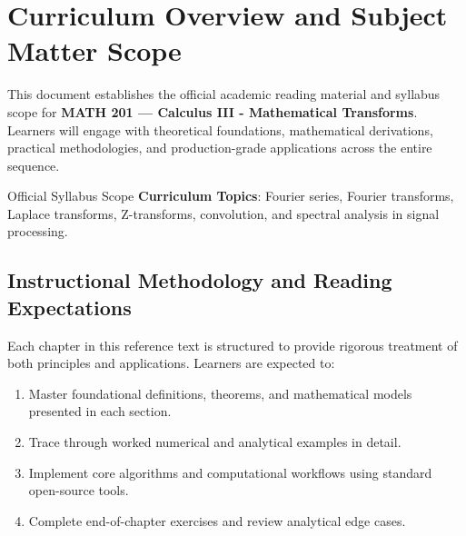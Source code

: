 \section{Curriculum Overview and Subject Matter Scope}

This document establishes the official academic reading material and syllabus scope for \textbf{MATH 201 --- Calculus III - Mathematical Transforms}. Learners will engage with theoretical foundations, mathematical derivations, practical methodologies, and production-grade applications across the entire sequence.

\begin{InsightBox}{Official Syllabus Scope}
  \textbf{Curriculum Topics}: Fourier series, Fourier transforms, Laplace transforms, Z-transforms, convolution, and spectral analysis in signal processing.
\end{InsightBox}

\subsection{Instructional Methodology and Reading Expectations}

Each chapter in this reference text is structured to provide rigorous treatment of both principles and applications. Learners are expected to:
\begin{enumerate}
  \item Master foundational definitions, theorems, and mathematical models presented in each section.
  \item Trace through worked numerical and analytical examples in detail.
  \item Implement core algorithms and computational workflows using standard open-source tools.
  \item Complete end-of-chapter exercises and review analytical edge cases.
\end{enumerate}

